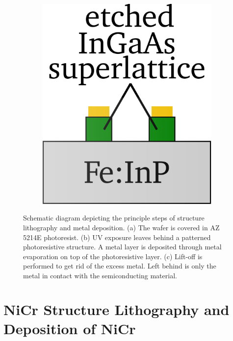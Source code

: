 \begin{figure}[!]
\begin{subfigure}[b]{0.21\textwidth}
        \caption{\centering}
        \label{fig:fab22}
    \end{subfigure}
    \hfill
    \begin{subfigure}[b]{0.21\textwidth}
        \centering
        \includegraphics[width=\textwidth]{figures/Fabrication/fab2_3.pdf}
        \caption{\centering}
        \label{fig:fab23}
    \end{subfigure}
    \caption{Schematic diagram depicting the principle steps of structure lithography and metal deposition. (a) The wafer is covered in AZ 5214E photoresist. (b) UV exposure leaves behind a patterned photoresistive structure. A metal layer is deposited through metal evaporation on top of the photoresistive layer. (c) Lift-off is performed to get rid of the excess metal. Left behind is only the metal in contact with the semiconducting material.}
\end{figure}


\section{NiCr Structure Lithography and Deposition of NiCr}


